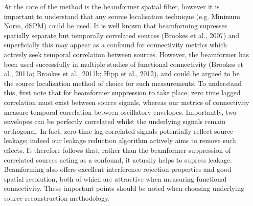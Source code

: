 At the core of the method is the beamformer spatial filter, however it is important to understand that any source localisation technique (e.g. Minimum Norm, dSPM) could be used. It is well known that beamforming supresses spatially separate but temporally correlated sources (Brookes et al., 2007) and superficially this may appear as a confound for connectivity metrics which actively seek temporal correlation between sources. However, the beamformer has been used successfully in multiple studies of functional connectivity (Brookes et al., 2011a; Brookes et al., 2011b; Hipp et al., 2012), and could be argued to be the source localisation method of choice for such measurements. To understand this, first note that for beamformer suppression to take place, zero time lagged correlation must exist between source signals, whereas our metrics of connectivity measure temporal correlation between oscillatory envelopes. Importantly, two envelopes can be perfectly correlated whilst the underlying signals remain orthogonal. In fact, zero-time-lag correlated signals potentially reflect source leakage; indeed our leakage reduction algorithm actively aims to remove such effects. It therefore follows that, rather than the beamformer suppression of correlated sources acting as a confound, it actually helps to supress leakage. Beamforming also offers excellent interference rejection properties and good spatial resolution, both of which are attractive when measuring functional connectivity. These important points should be noted when choosing underlying source reconstruction methodology. 

